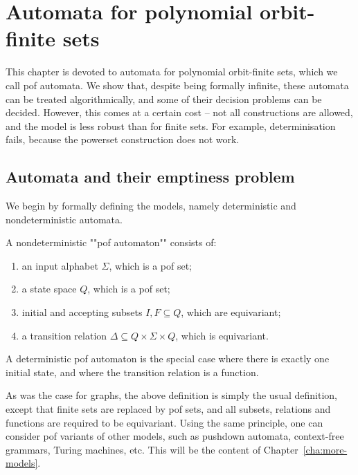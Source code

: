 \chapter{Automata for polynomial orbit-finite sets}
\label{sec:pof-algorithms}
This chapter is devoted to automata for polynomial orbit-finite sets, which we call pof automata. 
 We show that, despite being formally infinite, these automata can be treated algorithmically, and some of their decision problems can be decided. However, this comes at a certain cost -- not all constructions are allowed, and the model is less robust than for finite sets. For example, determinisation fails, because the powerset construction does not work. 


\section{Automata and their emptiness problem}
\label{sec:pof-automata}
We begin by formally defining the models, namely deterministic and nondeterministic automata. 
\begin{definition}
    A nondeterministic ""pof automaton"" consists of: 
    \begin{enumerate}
        \item an input alphabet $\Sigma$, which is a pof set;
        \item a state space $Q$, which is a pof set;
        \item initial and accepting subsets $I,F \subseteq Q$, which are equivariant;
        \item a transition relation $\Delta \subseteq Q \times \Sigma \times Q$, which is equivariant.
    \end{enumerate}
    A deterministic pof automaton is the special case where there is exactly one initial state, and where the transition relation is a function.
\end{definition}
As was the case for graphs, the  above definition is simply the usual definition, except that finite sets are replaced by pof sets, and all subsets, relations and functions are required to be equivariant. Using the same principle, one can consider pof variants of other models, such as  pushdown automata, context-free grammars,  Turing machines, etc. This will be the content of Chapter~\ref{cha:more-models}.





